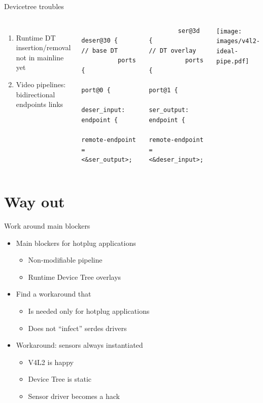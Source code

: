 \documentclass[xetex,table,aspectratio=169]{beamer}
\begin{document}
\begin{frame}[fragile]{Devicetree troubles}
  \begin{columns}
    \begin{enumerate}
    \item Runtime DT insertion/removal not in mainline yet
    \item Video pipelines: bidirectional endpoints links
    \end{enumerate}

    \begin{verbatim}
        deser@30 {                               // base DT
          ports {
            port@0 {
              deser_input: endpoint {
                remote-endpoint = <&ser_output>;
    \end{verbatim}

    \begin{verbatim}
        ser@3d {                              // DT overlay
          ports {
            port@1 {
              ser_output: endpoint {
                remote-endpoint = <&deser_input>;
    \end{verbatim}

    \center\texttt{[image: images/v4l2-ideal-pipe.pdf]}
  \end{columns}
\end{frame}


\section{Way out}

\begin{frame}{Work around main blockers}
  \begin{itemize}
  \item Main blockers for hotplug applications
    \begin{itemize}
    \item Non-modifiable pipeline
    \item Runtime Device Tree overlays
    \end{itemize}
    \pause
  \item Find a workaround that
    \begin{itemize}
    \item Is needed only for hotplug applications
    \item Does not ``infect'' serdes drivers
    \end{itemize}
    \pause
  \item Workaround: sensors always instantiated
    \begin{itemize}
    \item V4L2 is happy
    \item Device Tree is static
    \item Sensor driver becomes a hack
    \end{itemize}
  \end{itemize}
\end{frame}
\end{document}
